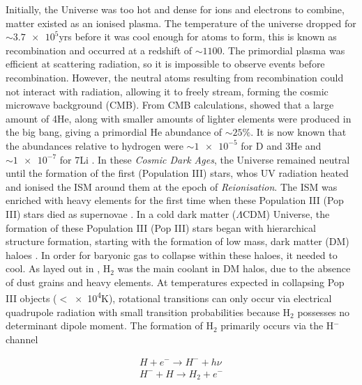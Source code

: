 \documentclass[11pt]{article}
\begin{document}
Initially, the Universe was too hot and dense for ions and electrons to combine, matter existed as an ionised plasma. The temperature of the universe dropped for $\sim\num{3.7e5}$yrs before it was cool enough for atoms to form, this is known as recombination and occurred at a redshift of $\sim1100$. The primordial plasma was efficient at scattering radiation, so it is impossible to observe events before recombination. However, the neutral atoms resulting from recombination could not interact with radiation, allowing it to freely stream, forming the cosmic microwave background (CMB). From CMB calculations, \citet{Peebles1966} showed that a large amount of 4He, along with smaller amounts of lighter elements were produced in the big bang, giving a primordial He abundance of $\sim25\%$. It is now known that the abundances relative to hydrogen were $\sim\num{1e-5}$ for D and 3He and $\sim\num{1e-7}$ for 7Li \citep{Copi1995}. In these \emph{Cosmic Dark Ages}, the Universe remained neutral until the formation of the first (Population III) stars, whos UV radiation heated and ionised the ISM around them \citep{Bromm2001} at the epoch of \emph{Reionisation}. The ISM was enriched  with heavy elements for the first time when these Population III (Pop III) stars died as supernovae \citep{Heger2003}.
In a cold dark matter ($\Lambda$CDM) Universe, the formation of these Population III (Pop III) stars began with hierarchical structure formation, starting with the formation of low mass, dark matter (DM) haloes \citep{Couchman1986}.
In order for baryonic gas to collapse within these haloes, it needed to cool. As layed out in \cite{Bromm2002}, H$_{2}$ was the main coolant in DM halos, due to the absence of dust grains and heavy elements. At temperatures expected in collapsing Pop III objects ($<$\num{e4}K), rotational transitions can only occur via electrical quadrupole radiation with small transition probabilities because H$_{2}$ possesses no determinant dipole moment. The formation of H$_{2}$ primarily occurs via the H$^{-}$ channel

\begin{equation}
\begin{split}
H + e^{-} \rightarrow H^{-} + h\nu
\\
H^{-} + H \rightarrow H_{2} + e^{-}
\end{split}
\end{equation}
\end{document}
